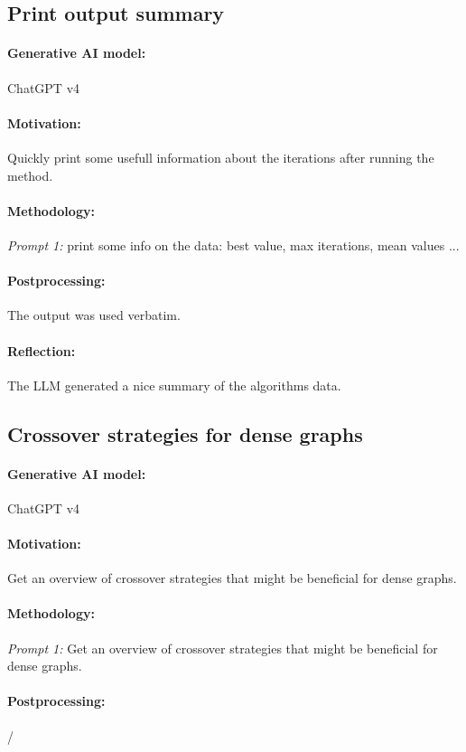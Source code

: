 \documentclass[a4paper,10pt]{article} %
\begin{document}
\subsection{Print output summary} 
\paragraph{Generative AI model:} ChatGPT v4
\paragraph{Motivation:}
Quickly print some usefull information about the iterations after running the method.

\paragraph{Methodology:} 
\textit{Prompt 1:}
print some info on the data: best value, max iterations, mean values ...
\paragraph{Postprocessing:} 
The output was used verbatim.
\paragraph{Reflection:} 
The LLM generated a nice summary of the algorithms data.



\subsection{Crossover strategies for dense graphs} 
\paragraph{Generative AI model:} ChatGPT v4
\paragraph{Motivation:}
Get an overview of crossover strategies that might be beneficial for dense graphs.
\paragraph{Methodology:} 
\textit{Prompt 1:}
Get an overview of crossover strategies that might be beneficial for dense graphs.
\paragraph{Postprocessing:} 
/
\end{document}
